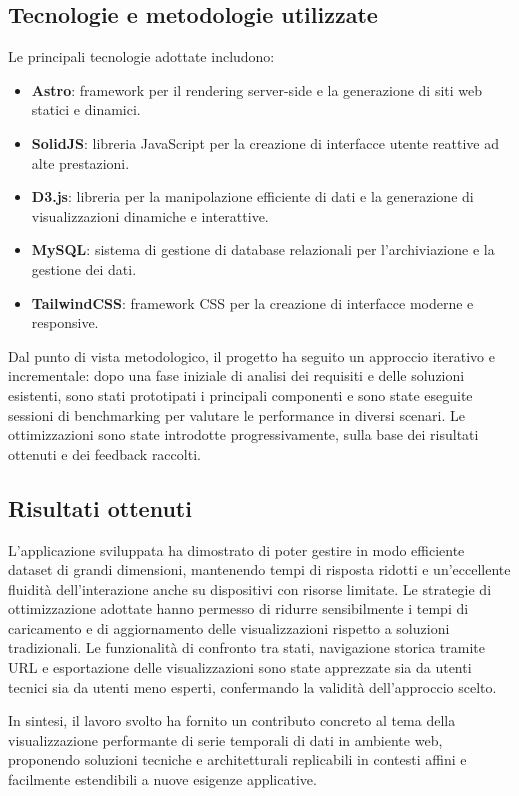 \subsection{Tecnologie e metodologie utilizzate}

Le principali tecnologie adottate includono:
\begin{itemize}
    \item \textbf{Astro}: framework per il rendering server-side e la generazione di siti web statici e dinamici.
    \item \textbf{SolidJS}: libreria JavaScript per la creazione di interfacce utente reattive ad alte prestazioni.
    \item \textbf{D3.js}: libreria per la manipolazione efficiente di dati e la generazione di visualizzazioni dinamiche e interattive.
    \item \textbf{MySQL}: sistema di gestione di database relazionali per l’archiviazione e la gestione dei dati.
    \item \textbf{TailwindCSS}: framework CSS per la creazione di interfacce moderne e responsive.
\end{itemize}

Dal punto di vista metodologico, il progetto ha seguito un approccio iterativo e incrementale: dopo una fase iniziale di analisi dei requisiti e delle soluzioni esistenti, sono stati prototipati i principali componenti e sono state eseguite sessioni di benchmarking per valutare le performance in diversi scenari. Le ottimizzazioni sono state introdotte progressivamente, sulla base dei risultati ottenuti e dei feedback raccolti.

\subsection{Risultati ottenuti}

L’applicazione sviluppata ha dimostrato di poter gestire in modo efficiente dataset di grandi dimensioni, mantenendo tempi di risposta ridotti e un’eccellente fluidità dell’interazione anche su dispositivi con risorse limitate. Le strategie di ottimizzazione adottate hanno permesso di ridurre sensibilmente i tempi di caricamento e di aggiornamento delle visualizzazioni rispetto a soluzioni tradizionali. Le funzionalità di confronto tra stati, navigazione storica tramite URL e esportazione delle visualizzazioni sono state apprezzate sia da utenti tecnici sia da utenti meno esperti, confermando la validità dell’approccio scelto.

In sintesi, il lavoro svolto ha fornito un contributo concreto al tema della visualizzazione performante di serie temporali di dati in ambiente web, proponendo soluzioni tecniche e architetturali replicabili in contesti affini e facilmente estendibili a nuove esigenze applicative.
